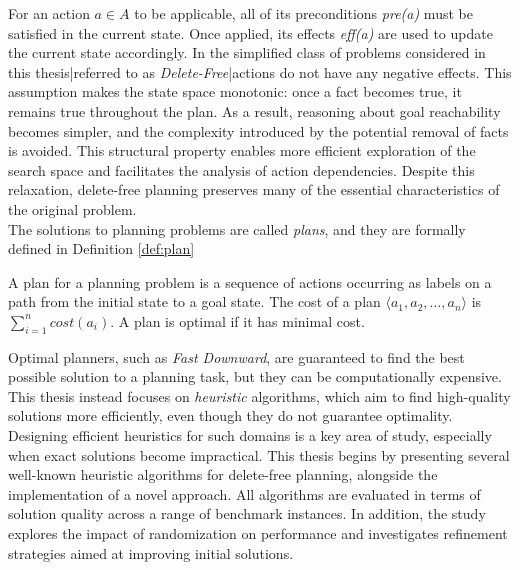 For an action $a \in A$ to be applicable, all of its preconditions
\textit{pre(a)} must be satisfied in the current state. Once applied, its effects
\textit{eff(a)} are used to update the current state accordingly.
In the simplified class of problems considered in this thesis|referred to as \textit{Delete-Free}|actions do not have any negative effects.
This assumption makes the state space monotonic: once a fact becomes true, it remains true throughout the plan.
As a result, reasoning about goal reachability becomes simpler, and the complexity introduced by the potential removal of facts is avoided.
This structural property enables more efficient exploration of the search space and facilitates the analysis of action dependencies.
Despite this relaxation, delete-free planning preserves many of the essential characteristics of the original problem.\\
The solutions to planning problems are called \textit{plans}, and they are formally defined in Definition \ref{def:plan}

\begin{definition}[Plan]
	\label{def:plan}
	A plan for a planning problem is a sequence of actions occurring as labels on a path
	from the initial state to a goal state.
	The cost of a plan $\langle a_1, a_2, \dots, a_n \rangle$ is $\sum_{i = 1}^n cost(a_i)$.
	A plan is optimal if it has minimal cost.
\end{definition}

Optimal planners, such as \textit{Fast Downward}, are guaranteed to find the best possible solution to a planning task, but they can be
computationally expensive. This thesis instead focuses on \textit{heuristic} algorithms, which aim to find high-quality solutions more efficiently,
even though they do not guarantee optimality.
Designing efficient heuristics for such domains is a key area of study, especially when exact solutions become impractical.
This thesis begins by presenting several well-known heuristic algorithms for delete-free planning, alongside the implementation of a novel approach.
All algorithms are evaluated in terms of solution quality across a range of benchmark instances. In addition, the study explores the impact of
randomization on performance and investigates refinement strategies aimed at improving initial solutions.
